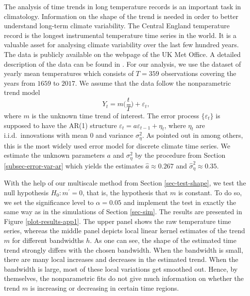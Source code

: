 The analysis of time trends in long temperature records is an important task in climatology. Information on the shape of the trend is needed in order to better understand long-term climate variability. The Central England temperature record is the longest instrumental temperature time series in the world. It is a valuable asset for analysing climate variability over the last few hundred years. The data is publicly available on the webpage of the UK Met Office. A detailed description of the data can be found in \cite{Parker1992}. For our analysis, we use the dataset of yearly mean temperatures which consists of $T=359$ observations covering the years from $1659$ to $2017$. We assume that the data follow the nonparametric trend model 
\[ Y_t = m\Big(\frac{t}{T}\Big) + \varepsilon_t, \]
where $m$ is the unknown time trend of interest. The error process $\{ \varepsilon_t \}$ is supposed to have the AR(1) structure $\varepsilon_t = a \varepsilon_{t-1} + \eta_t$, where $\eta_t$ are i.i.d.\ innovations with mean $0$ and variance $\sigma_\eta^2$. As pointed out in \cite{Mudelsee2010} among others, this is the most widely used error model for discrete climate time series. We estimate the unknown parameters $a$ and $\sigma_\eta^2$ by the procedure from Section \ref{subsec-error-var-ar} which yields the estimates $\widehat{a} \approx 0.267$ and $\widehat{\sigma}_\eta^2 \approx 0.35$.


With the help of our multiscale method from Section \ref{sec-test-shape}, we test the null hypothesis $H_0: m^\prime = 0$, that is, the hypothesis that $m$ is constant. To do so, we set the significance level to $\alpha = 0.05$ and implement the test in exactly the same way as in the simulations of Section \ref{sec-sim}. The results are presented in Figure \ref{plot-results-app1}. The upper panel shows the raw temperature time series, whereas the middle panel depicts local linear kernel estimates of the trend $m$ for different bandwidths $h$. As one can see, the shape of the estimated time trend strongly differs with the chosen bandwidth. When the bandwidth is small, there are many local increases and decreases in the estimated trend. When the bandwidth is large, most of these local variations get smoothed out. Hence, by themselves, the nonparametric fits do not give much information on whether the trend $m$ is increasing or decreasing in certain time regions. 


